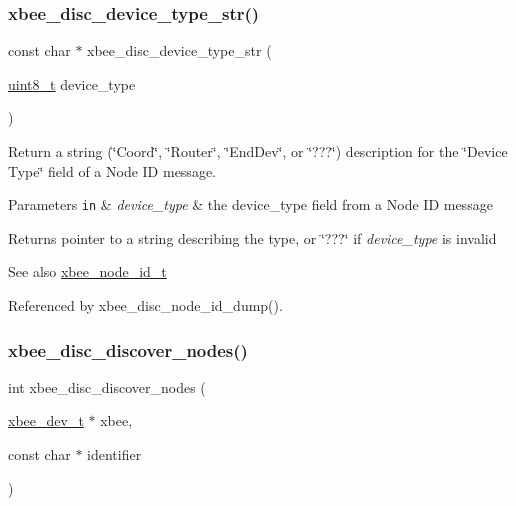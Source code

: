 \subsubsection{\texorpdfstring{xbee\+\_\+disc\+\_\+device\+\_\+type\+\_\+str()}{xbee\_disc\_device\_type\_str()}}
{\footnotesize\ttfamily const char $\ast$ xbee\+\_\+disc\+\_\+device\+\_\+type\+\_\+str (\begin{DoxyParamCaption}\item[{\hyperlink{group__hal__dos_gae1affc9ca37cfb624959c866a73f83c2}{uint8\+\_\+t}}]{device\+\_\+type }\end{DoxyParamCaption})}



Return a string (\char`\"{}\+Coord\char`\"{}, \char`\"{}\+Router\char`\"{}, \char`\"{}\+End\+Dev\char`\"{}, or \char`\"{}???\char`\"{}) description for the \char`\"{}\+Device Type\char`\"{} field of a Node ID message. 


\begin{DoxyParams}[1]{Parameters}
\mbox{\tt in}  & {\em device\+\_\+type} & the device\+\_\+type field from a Node ID message\\
\hline
\end{DoxyParams}
\begin{DoxyReturn}{Returns}
pointer to a string describing the type, or \char`\"{}???\char`\"{} if {\itshape device\+\_\+type} is invalid
\end{DoxyReturn}
\begin{DoxySeeAlso}{See also}
\hyperlink{structxbee__node__id__t}{xbee\+\_\+node\+\_\+id\+\_\+t} 
\end{DoxySeeAlso}


Referenced by xbee\+\_\+disc\+\_\+node\+\_\+id\+\_\+dump().

\mbox{\label{group__xbee__discovery_ga12d6a10c8348cf5eb9636bbf02420dd3}} 
\subsubsection{\texorpdfstring{xbee\+\_\+disc\+\_\+discover\+\_\+nodes()}{xbee\_disc\_discover\_nodes()}}
{\footnotesize\ttfamily int xbee\+\_\+disc\+\_\+discover\+\_\+nodes (\begin{DoxyParamCaption}\item[{\hyperlink{structxbee__dev__t}{xbee\+\_\+dev\+\_\+t} $\ast$}]{xbee,  }\item[{const char $\ast$}]{identifier }\end{DoxyParamCaption})}



